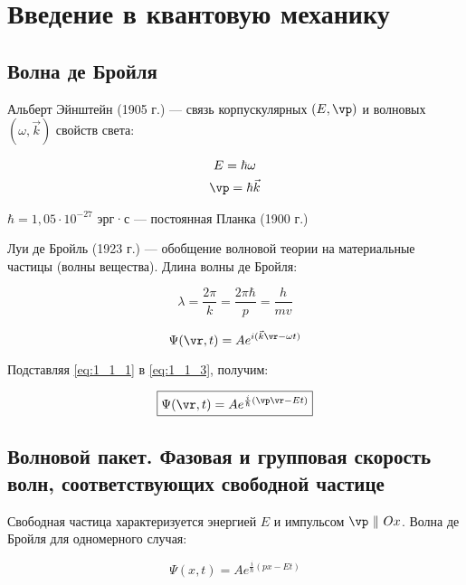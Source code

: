 \chapter{Введение в квантовую механику}

\section{Волна де Бройля}

Альберт Эйнштейн (1905 г.) --- связь корпускулярных $(E, \vp)$ и волновых $(\omega, \vec{k})$ свойств света:

\begin{equation}
\label{eq:1_1_1}
\begin{gathered}
E = \hbar \omega \\ 
\vp = \hbar \vec{k}
\end{gathered}
\end{equation}

$\hbar = 1{,}05 \cdot 10^{-27}$ эрг·с --- постоянная Планка (1900 г.)

Луи де Бройль (1923 г.) --- обобщение волновой теории на материальные частицы (волны вещества). Длина волны де Бройля:

\begin{equation}
\label{eq:1_1_2}
\lambda = \frac{2\pi}{k} = \frac{2\pi \hbar}{p} = \frac{h}{mv}
\end{equation}

\begin{equation}
\label{eq:1_1_3}
\Psi (\vr, t) = A e^{i(\vec{k}\vr - \omega t)}
\end{equation}

Подставляя \eqref{eq:1_1_1} в \eqref{eq:1_1_3}, получим:

\begin{equation}
\label{eq:1_1_4}
\boxed{\Psi(\vr,t) = A e^{\frac{i}{\hbar}(\vp\vr - Et)}}
\end{equation}

\begin{sloppypar}
  \section{Волновой пакет. Фазовая и групповая скорость волн, соответствующих свободной частице}
\end{sloppypar}

Свободная частица характеризуется энергией $E$ и импульсом $\vp~ \|~ Ox$. Волна де Бройля для одномерного случая:

\begin{equation}
\label{eq:1_2_1}
\Psi(x,t) = A e^{\frac{i}{\hbar}(px - Et)}
\end{equation}

